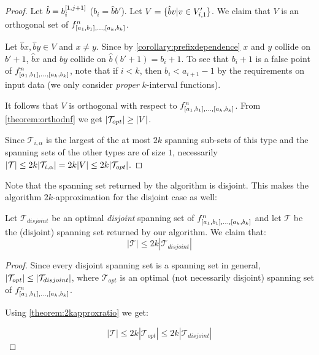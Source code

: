 \begin{proof}
Let $\hat{b} = b_i^{[1, j+1]}$ ($b_i = \hat{b} b'$).
Let $V = \{\hat{b} v | v \in V_{i, 1}'\}$.
We claim that $V$ is an orthogonal set of
$f^{n}_{[a_1, b_1], \ldots, [a_{k}, b_{k}]}$.

Let $\hat{b} x, \hat{b} y \in V$
and $x \neq y$.
Since by \cref{corollary:prefixdependence}
$x$ and $y$ collide on $b'+1$,
$\hat{b} x$ and $\hat{b} y$
collide on
$\hat{b} (b'+1) = b_i+1$.
To see that $b_i+1$ is a false point of $f^{n}_{[a_1, b_1], \ldots, [a_{k}, b_{k}]}$,
note that if $i<k$,
then $b_i < a_{i+1} - 1$
by the requirements on input data
(we only consider \emph{proper} $k$-interval functions).

It follows that $V$ is orthogonal
with respect to $f^{n}_{[a_1, b_1], \ldots, [a_{k}, b_{k}]}$.
From \cref{theorem:orthodnf} we get
$\lvert\mathcal{T}_{opt}\rvert \geq \lvert V\rvert$.

Since $\mathcal{T}_{i, \alpha}$ is
the largest of the at most $2k$ spanning sub-sets
of this type
and the spanning sets of the other types are of size $1$,
necessarily
$\lvert\mathcal{T}\rvert \leq 2k \lvert\mathcal{T}_{i, \alpha}\rvert
= 2k \lvert V\rvert \leq 2k \lvert\mathcal{T}_{opt}\rvert$.
\end{proof}

Note that the spanning set returned by the algorithm
is disjoint.
This makes the algorithm $2k$-approximation
for the disjoint case as well:

\begin{theorem}
Let $\mathcal{T}_{disjoint}$ be an optimal \emph{disjoint}
spanning set of
$f^n_{[a_1, b_1], \ldots, [a_k, b_k]}$
and let $\mathcal{T}$ be the (disjoint)
spanning set returned by our algorithm.
We claim that:
\begin{equation*}
|\mathcal{T}| \leq 2k |\mathcal{T}_{disjoint}|
\end{equation*}
\end{theorem}

\begin{proof}
Since every disjoint spanning set
is a spanning set in general,
$\lvert\mathcal{T}_{opt}\rvert \leq
\lvert\mathcal{T}_{disjoint}\rvert$,
where $\mathcal{T}_{opt}$ is an optimal
(not necessarily disjoint)
spanning set of
$f^n_{[a_1, b_1], \ldots, [a_k, b_k]}$.

Using \cref{theorem:2kapproxratio} we get:

\begin{equation*}
|\mathcal{T}| \leq 2k |\mathcal{T}_{opt}|
\leq 2k |\mathcal{T}_{disjoint}|
\end{equation*}
\end{proof}

